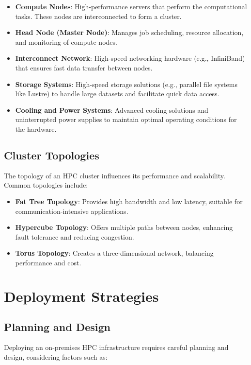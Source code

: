 \begin{itemize}
    \item \textbf{Compute Nodes}: High-performance servers that perform the computational tasks. These nodes are interconnected to form a cluster.
    \item \textbf{Head Node (Master Node)}: Manages job scheduling, resource allocation, and monitoring of compute nodes.
    \item \textbf{Interconnect Network}: High-speed networking hardware (e.g., InfiniBand) that ensures fast data transfer between nodes.
    \item \textbf{Storage Systems}: High-speed storage solutions (e.g., parallel file systems like Lustre) to handle large datasets and facilitate quick data access.
    \item \textbf{Cooling and Power Systems}: Advanced cooling solutions and uninterrupted power supplies to maintain optimal operating conditions for the hardware.
\end{itemize}

\subsection{Cluster Topologies}

The topology of an HPC cluster influences its performance and scalability. Common topologies include:

\begin{itemize}
    \item \textbf{Fat Tree Topology}: Provides high bandwidth and low latency, suitable for communication-intensive applications.
    \item \textbf{Hypercube Topology}: Offers multiple paths between nodes, enhancing fault tolerance and reducing congestion.
    \item \textbf{Torus Topology}: Creates a three-dimensional network, balancing performance and cost.
\end{itemize}

\section{Deployment Strategies}

\subsection{Planning and Design}

Deploying an on-premises HPC infrastructure requires careful planning and design, considering factors such as:

